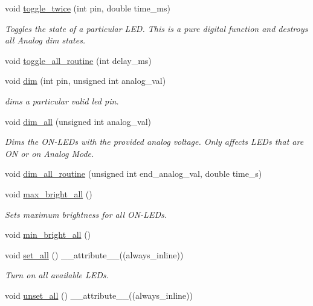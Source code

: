 \begin{DoxyCompactItemize}
void \hyperlink{classLEDSet_a6062da843aabdf8fbdcedb70fed00dec}{toggle\+\_\+twice} (int pin, double time\+\_\+ms)
\begin{DoxyCompactList}\small\item\em Toggles the state of a particular L\+ED. This is a pure digital function and destroys all Analog dim states. \end{DoxyCompactList}\item 
void \hyperlink{classLEDSet_a61cc024950a5b66dff34c449cc73787f}{toggle\+\_\+all\+\_\+routine} (int delay\+\_\+ms)
\item 
void \hyperlink{classLEDSet_a8a5ef40584236c3793e4274688eac379}{dim} (int pin, unsigned int analog\+\_\+val)
\begin{DoxyCompactList}\small\item\em dims a particular valid led pin. \end{DoxyCompactList}\item 
void \hyperlink{classLEDSet_ad8313aa0c4fc34cd3481db0fade6318c}{dim\+\_\+all} (unsigned int analog\+\_\+val)
\begin{DoxyCompactList}\small\item\em Dims the O\+N-\/\+L\+E\+Ds with the provided analog voltage. Only affects L\+E\+Ds that are ON or on Analog Mode. \end{DoxyCompactList}\item 
void \hyperlink{classLEDSet_a30c6efe7fc286c3d0a7e2ac210dd2c1e}{dim\+\_\+all\+\_\+routine} (unsigned int end\+\_\+analog\+\_\+val, double time\+\_\+s)
\item 
void \hyperlink{classLEDSet_a73dae073882d369a9cc9b9a93f446157}{max\+\_\+bright\+\_\+all} ()
\begin{DoxyCompactList}\small\item\em Sets maximum brightness for all O\+N-\/\+L\+E\+Ds. \end{DoxyCompactList}\item 
void \hyperlink{classLEDSet_a9479e36e91b5b1387cfc27722a4a6007}{min\+\_\+bright\+\_\+all} ()
\item 
void \hyperlink{classLEDSet_aaebfea59ba933621c4f7d7d405119702}{set\+\_\+all} () \+\_\+\+\_\+attribute\+\_\+\+\_\+((always\+\_\+inline))
\begin{DoxyCompactList}\small\item\em Turn on all available L\+E\+Ds. \end{DoxyCompactList}\item 
void \hyperlink{classLEDSet_aabff2609d8df733936dda53d60302b72}{unset\+\_\+all} () \+\_\+\+\_\+attribute\+\_\+\+\_\+((always\+\_\+inline))

\end{DoxyCompactItemize}
